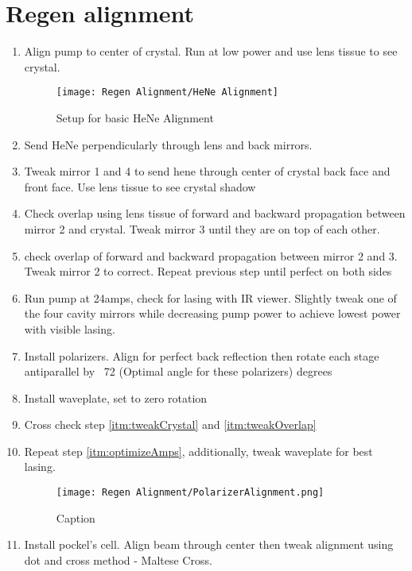 \documentclass{article}
\begin{document}
\section{Regen alignment}
\begin{enumerate}
    \item Align pump to center of crystal. Run at low power and use lens tissue to see crystal.
          \begin{figure}[!ht]
              \centering
              \texttt{[image: Regen Alignment/HeNe Alignment]}
              \caption{Setup for basic HeNe Alignment}
              \label{fig:HeNe_alignment}
          \end{figure}
    \item Send HeNe perpendicularly through lens and back mirrors.
    \item \label{itm:tweakCrystal} Tweak mirror 1 and 4 to send hene through center of crystal back face and front face. Use lens tissue to see crystal shadow
    \item \label{itm:tweakOverlap} Check overlap using lens tissue of forward and backward propagation between mirror 2 and crystal. Tweak mirror 3 until they are on top of each other.
    \item check overlap of forward and backward propagation between mirror 2 and 3. Tweak mirror 2 to correct. Repeat previous step until perfect on both sides
    \item \label{itm:optimizeAmps} Run pump at 24amps, check for lasing with IR viewer. Slightly tweak one of the four cavity mirrors while decreasing pump power to achieve lowest power with visible lasing.
    \item Install polarizers. Align for perfect back reflection then rotate each stage antiparallel by ~72 (Optimal angle for these polarizers) degrees
    \item Install waveplate, set to zero rotation
    \item Cross check step \ref{itm:tweakCrystal} and \ref{itm:tweakOverlap}
    \item Repeat step \ref{itm:optimizeAmps}, additionally, tweak waveplate for best lasing.
          \begin{figure}[!ht]
              \centering
              \texttt{[image: Regen Alignment/PolarizerAlignment.png]}
              \caption{Caption}
              \label{fig:polarizer_alignment}
          \end{figure}
    \item Install pockel's cell. Align beam through center then tweak alignment using dot and cross method - Maltese Cross.

\end{enumerate}
\end{document}
